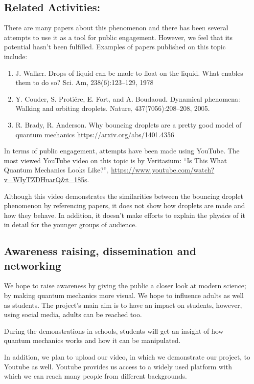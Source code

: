 \subsection{Related Activities:}

There are many papers about this phenomenon and there has been several attempts to use it as a tool for public engagement. However, we feel that its potential hasn't been fulfilled. Examples of papers published on this topic include:
\begin{enumerate}
    \item J. Walker. Drops of liquid can be made to float on the liquid. What enables them to do so? Sci. Am, 238(6):123--129, 1978
    \item Y. Couder, S. Proti\'ere, E. Fort, and A. Boudaoud. Dynamical phenomena: Walking and orbiting droplets. Nature, 437(7056):208--208, 2005.
    \item R. Brady, R. Anderson. Why bouncing droplets are a pretty good model of quantum mechanics \url{https://arxiv.org/abs/1401.4356}
\end{enumerate}

In terms of public engagement, attempts have been made using YouTube. The most viewed YouTube video on this topic is by Veritasium: ``Is This What Quantum Mechanics Looks Like?'', \url{https://www.youtube.com/watch?v=WIyTZDHuarQ\&t=185s}. 

Although this video demonstrates the similarities between the bouncing droplet phenomenon by referencing papers, it does not show how droplets are made and how they behave. In addition, it doesn't make efforts to explain the physics of it in detail for the younger groups of audience. 

\subsection{Awareness raising, dissemination and networking}

We hope to raise awareness by giving the public a closer look at modern science; by making quantum mechanics more visual. We hope to influence adults as well as students. The project's main aim is to have an impact on students, however, using social media, adults can be reached too. 

During the demonstrations in schools, students will get an insight of how quantum mechanics works and how it can be manipulated. 

In addition, we plan to upload our video, in which we demonstrate our project, to Youtube as well. Youtube provides us access to a widely used platform with which we can reach many people from different backgrounds.

